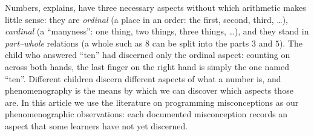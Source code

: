 
Numbers, \textcite[p.~25]{NCOL} explains, have three necessary aspects without
which arithmetic makes little sense: they are \emph{ordinal} (a place in an
order: the first, second, third, \dots), \emph{cardinal} (a \enquote{manyness}:
one thing, two things, three things, \dots), and they stand in \emph{part--whole}
relations (a whole such as \(8\) can be split into the parts \(3\) and \(5\)).
The child who answered \enquote{ten} had discerned only the ordinal aspect:
counting on across both hands, the last finger on the right hand is simply the
one named \enquote{ten}. Different children discern different aspects of what a
number is, and phenomenography is the means by which we can discover which
aspects those are. In this article we use the literature on programming
misconceptions as our phenomenographic observations: each documented
misconception records an aspect that some learners have not yet discerned.

